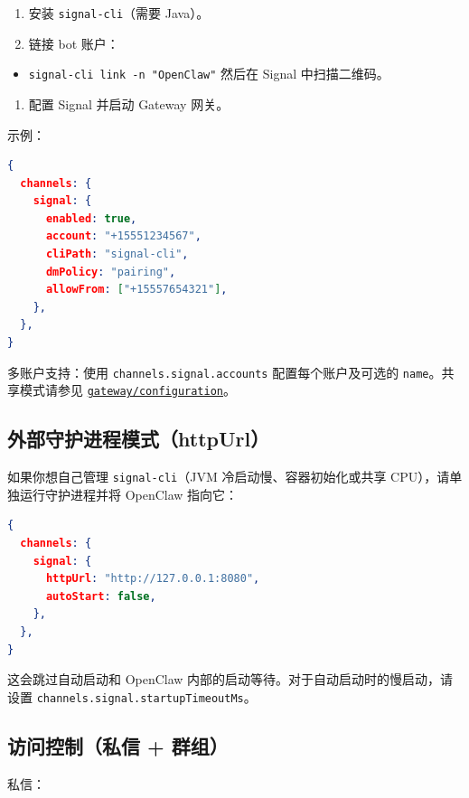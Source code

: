 \begin{enumerate}
  \item 安装 \texttt{signal-cli}（需要 Java）。
  \item 链接 bot 账户：
\end{enumerate}

\begin{itemize}
  \item \texttt{signal-cli link -n "OpenClaw"} 然后在 Signal 中扫描二维码。
\end{itemize}

\begin{enumerate}
  \item 配置 Signal 并启动 Gateway 网关。
\end{enumerate}


示例：

\begin{lstlisting}[language=json]
{
  channels: {
    signal: {
      enabled: true,
      account: "+15551234567",
      cliPath: "signal-cli",
      dmPolicy: "pairing",
      allowFrom: ["+15557654321"],
    },
  },
}
\end{lstlisting}


多账户支持：使用 \texttt{channels.signal.accounts} 配置每个账户及可选的 \texttt{name}。共享模式请参见 \href{/gateway/configuration\#telegramaccounts--discordaccounts--slackaccounts--signalaccounts--imessageaccounts}{\texttt{gateway/configuration}}。

\subsection{外部守护进程模式（httpUrl）}


如果你想自己管理 \texttt{signal-cli}（JVM 冷启动慢、容器初始化或共享 CPU），请单独运行守护进程并将 OpenClaw 指向它：

\begin{lstlisting}[language=json]
{
  channels: {
    signal: {
      httpUrl: "http://127.0.0.1:8080",
      autoStart: false,
    },
  },
}
\end{lstlisting}


这会跳过自动启动和 OpenClaw 内部的启动等待。对于自动启动时的慢启动，请设置 \texttt{channels.signal.startupTimeoutMs}。

\subsection{访问控制（私信 + 群组）}


私信：

